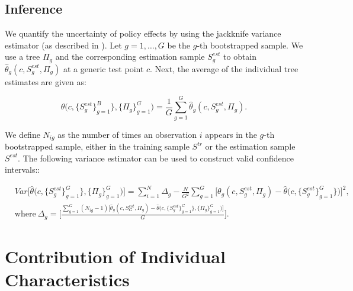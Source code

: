 \documentclass[12pt]{article}
\begin{document}
\subsection{Inference}\label{app_sub_inference}
We quantify the uncertainty of policy effects by using the jackknife variance estimator (as described in \citealp{wager2018estimation}). Let $g = 1, \dots, G$ be the $g$-th bootstrapped sample. We use a tree $\Pi_g$ and the corresponding estimation sample $S_g^{est}$ to obtain $\hat{\theta}_g(c, S_g^{est}, \Pi_g)$ at a generic test point $c$.  Next, the average of the individual tree estimates are given as:

$$\hat{\theta}\big(c, \{S_g^{est}\}_{g=1}^B\}, \{\Pi_g\}_{g=1}^G\big) = \frac{1}{G}\sum_{g = 1}^G\hat{\theta}_g(c, S_g^{est}, \Pi_g).$$ 

We define $N_{ig}$ as the number of times an observation $i$ appears in the $g$-th bootstrapped sample, either in the training sample $S^{tr}$ or the estimation sample $S^{est}$. The following variance estimator can be used to construct valid confidence intervals::

\begin{align}
    &Var\big[\hat{\theta}\big(c, \{S_g^{est}\}_{g=1}^G\}, \{\Pi_g\}_{g=1}^G\big) \big] =  \sum_{i = 1}^N \Delta_g - \frac{N}{G^2}\sum_{g=1}^G\big[ {\theta}_g(c, S_g^{est}, \Pi_g) -  \hat{\theta}\big(c, \{S_g^{est}\}_{g=1}^G\}\big)     \big]^2,    \\
    & \text{where} \ \Delta_g = \bigg [ \frac{\sum_{g = 1}^G(N_{ig}-1)\big[\hat{\theta}_g(c, S_G^{est}, \Pi_g) -  \hat{\theta}\big(c, \{S_g^{est}\}_{g=1}^G\}, \{\Pi_g\}_{g=1}^G\big)\big]}{G}\bigg]. \nonumber
\end{align}


\section{Contribution of Individual Characteristics} \label{app_contr}
\end{document}
